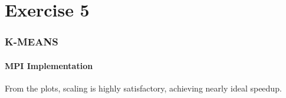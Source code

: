 \documentclass{article}
\newcommand{\eng}[1]{#1}
\begin{document}
\clearpage
\part{Exercise 5}
\label{chapter_5}

\section{\eng{K-MEANS}}

\subsection{\eng{MPI} Implementation}

From the plots, scaling is highly satisfactory, achieving nearly ideal \eng{speedup}.
\end{document}
